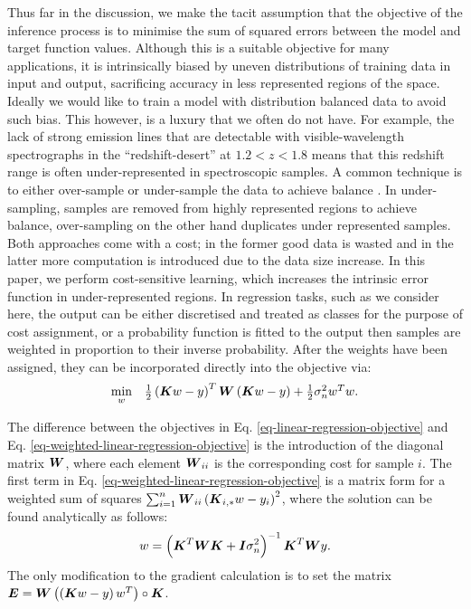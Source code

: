 \documentclass[useAMS,usenatbib,fleqn]{mn2e}
\begin{document}
Thus far in the discussion, we make the tacit assumption that the objective of the inference process is to minimise the sum of squared errors between the model and target function values. Although this is a suitable objective for many applications, it is intrinsically biased by uneven distributions of training data in input and output, sacrificing accuracy in less represented regions of the space. Ideally we would like to train a model with distribution balanced data to avoid such bias. This however, is a luxury that we often do not have. For example, the lack of strong emission lines that are detectable with visible-wavelength spectrographs in the ``redshift-desert'' at $1.2 < z <1.8$ means that this redshift range is often under-represented in spectroscopic samples. A common technique is to either over-sample or under-sample the data to achieve balance \citep{weiss2007}. In under-sampling, samples are removed from highly represented regions to achieve balance, over-sampling on the other hand duplicates under represented samples. Both approaches come with a cost; in the former good data is wasted and in the latter more computation is introduced due to the data size increase. In this paper, we perform cost-sensitive learning, which increases the intrinsic error function in under-represented regions. In regression tasks, such as we consider here, the output can be either discretised and treated as classes for the purpose of cost assignment, or a probability function is fitted to the output then samples are weighted in proportion to their inverse probability. After the weights have been assigned, they can be incorporated directly into the objective via:
\begin{equation}
\label{eq-weighted-linear-regression-objective}
\begin{array}{lcl}
\underset{w}{\text{min}} &\frac{1}{2}\left ( \bmath{K}w-y \right )^{T} \bmath{W}\left( \bmath{K}w-y \right )+\frac{1}{2}\sigma_{n}^{2}w^{T}w.
\end{array}
\end{equation}

The difference between the objectives in Eq. \eqref{eq-linear-regression-objective} and Eq. \eqref{eq-weighted-linear-regression-objective} is the introduction of the diagonal matrix $\bmath{W}$, where each element $\bmath{W}_{ii}$ is the corresponding cost for sample $i$. The first term in Eq. \eqref{eq-weighted-linear-regression-objective} is a matrix form for a weighted sum of squares $\sum_{i=1}^{n}\bmath{W}_{ii}\left(\bmath{K}_{i,*}w-y_{i}\right)^{2}$, where the solution can be found analytically as follows:
\begin{equation}
\label{eq-weighted-linear-regression-objective-rectangular}
w = \left(\bmath{K}^{T}\bmath{WK}+\bmath{I}\sigma_{n}^{2} \right)^{-1}\bmath{K}^{T}\bmath{W}y.
\end{equation}
The only modification to the gradient calculation is to set the matrix $\bmath{E}=\bmath{W}\left(\left(\bmath{K}w-y\right)w^{T}\right)\circ\bmath{K}$.
\end{document}
